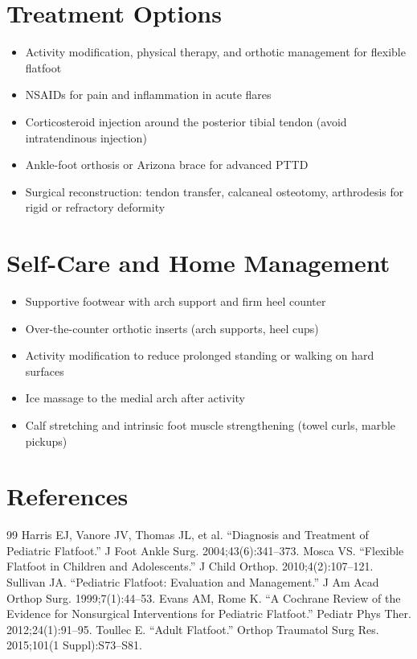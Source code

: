 \section*{Treatment Options}
\begin{itemize}
  \item Activity modification, physical therapy, and orthotic management for flexible flatfoot
  \item NSAIDs for pain and inflammation in acute flares
  \item Corticosteroid injection around the posterior tibial tendon (avoid intratendinous injection)
  \item Ankle-foot orthosis or Arizona brace for advanced PTTD
  \item Surgical reconstruction: tendon transfer, calcaneal osteotomy, arthrodesis for rigid or refractory deformity
\end{itemize}

\section*{Self-Care and Home Management}
\begin{itemize}
  \item Supportive footwear with arch support and firm heel counter
  \item Over-the-counter orthotic inserts (arch supports, heel cups)
  \item Activity modification to reduce prolonged standing or walking on hard surfaces
  \item Ice massage to the medial arch after activity
  \item Calf stretching and intrinsic foot muscle strengthening (towel curls, marble pickups)
\end{itemize}

\section*{References}
\begin{thebibliography}{99}
 Harris EJ, Vanore JV, Thomas JL, et al. ``Diagnosis and Treatment of Pediatric Flatfoot.'' J Foot Ankle Surg. 2004;43(6):341--373.
 Mosca VS. ``Flexible Flatfoot in Children and Adolescents.'' J Child Orthop. 2010;4(2):107--121.
 Sullivan JA. ``Pediatric Flatfoot: Evaluation and Management.'' J Am Acad Orthop Surg. 1999;7(1):44--53.
 Evans AM, Rome K. ``A Cochrane Review of the Evidence for Nonsurgical Interventions for Pediatric Flatfoot.'' Pediatr Phys Ther. 2012;24(1):91--95.
 Toullec E. ``Adult Flatfoot.'' Orthop Traumatol Surg Res. 2015;101(1 Suppl):S73--S81.
\end{thebibliography}
